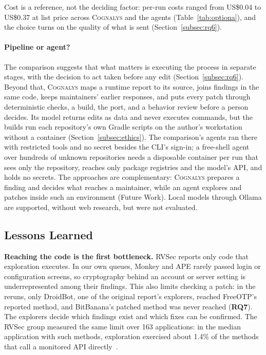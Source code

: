 \documentclass[conference]{IEEEtran}
\newcommand{\system}{\textsc{Cognalys}}
\newcommand{\researchq}[1]{\textbf{RQ#1}}
\begin{document}
Cost is a reference, not the deciding factor: per-run costs ranged from US\$0.04
to US\$0.37 at list price across \system{} and the agents
(Table~\ref{tab:optiona}), and the choice turns on the quality of what is sent (Section~\ref{subsec:rq6}).

\paragraph{Pipeline or agent?} The comparison suggests that what matters is
executing the process in separate stages, with the decision to act taken before
any edit (Section~\ref{subsec:rq6}). Beyond that, \system{} maps a runtime
report to its source, joins
findings in the same code, keeps maintainers' earlier responses, and puts every
patch through deterministic checks, a build, the port, and a behavior review
before a person decides. Its model returns edits as data and never executes
commands, but the builds run each repository's own Gradle scripts on the
author's workstation without a container (Section~\ref{subsec:ethics}). The
comparison's agents ran there with restricted tools and no secret besides the
CLI's sign-in; a free-shell agent over hundreds of unknown repositories needs a
disposable container per run that sees only the repository, reaches only
package registries and the model's API, and holds no secrets. The approaches
are complementary: \system{} prepares a finding and decides what reaches a
maintainer, while an agent explores and patches inside such an environment
(Future Work). Local models through Ollama are supported, without web
research, but were not evaluated.

\subsection{Lessons Learned}
\label{sec:lessons}

\textbf{Reaching the code is the first bottleneck.} RVSec reports only code
that exploration executes. In our own queues, Monkey and APE rarely passed
login or configuration screens, so cryptography behind an account or server
setting is underrepresented among their findings. This also limits checking a
patch: in the reruns, only DroidBot, one of the original report's explorers,
reached FreeOTP's reported method, and BitBanana's patched
method was never reached (\researchq{7}). The explorers decide which findings exist and which
fixes can be confirmed. The RVSec group measured the same limit over 163
applications: in the median application with such methods, exploration
exercised about 1.4\% of the methods that call a monitored API
directly~\cite{costa2026effectiveness}.
\end{document}
